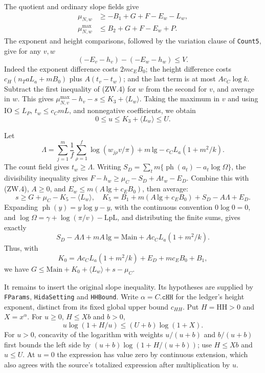 The quotient and ordinary slope fields give
\[
 \begin{split}
 \mu_{N,w}&\ge-B_1+G+F-E_w-L_w,\\
 \mu_{N,w}^{\max}&\le B_2+G+F-E_w+P.
 \end{split}                                                       \tag{ZW.4}
\]
The exponent and height comparisons, followed by the variation clause of
\texttt{Count5}, give for any $v,w$
\[
 (-E_v-h_v)-(-E_w-h_w)\le V.                                      \tag{ZW.5}
\]
Indeed the exponent difference costs $2mc_EB_0$; the height difference
costs $c_H(n_TaL_a+mB_0)$ plus $A(t_v-t_w)$; and the last term is
at most $Ac_C\log k$.  Subtract the first inequality of (ZW.4) for
$w$ from the second for $v$, and average in $w$.  This gives
$\mu_{N,v}^{\max}-h_v-s\le K_3+\langle L_w\rangle$.
Taking the maximum in $v$ and using
$\mathrm{IO}\le L_P$, $t_w\le c_CmL$, and nonnegative coefficients,
we obtain
\[
             0\le u\le K_3+\langle L_w\rangle\le U.              \tag{ZW.6}
\]

Let
\[
 \Lambda=\sum_{j=1}^m\frac1f\sum_{\rho=1}^f
                 \log(w_{j\rho}v/\pi)+m\,\mathrm{lg}
                       -c_C L_a(1+m^2/k).
\]
The count field gives $t_w\ge\Lambda$.
Writing $S_D=\sum_t m\{\operatorname{ph}(a_t)-a_t\log\Omega\}$,
the divisibility inequality gives
$F-h_w\ge\mu_C-S_D+At_w-E_D$.
Combine this with (ZW.4), $A\ge0$, and
$E_w\le m(A\,\mathrm{lg}+c_EB_0)$, then average:
\[
 s\ge G+\mu_C-K_5-\langle L_w\rangle,\quad
 K_5=B_1+m(A\,\mathrm{lg}+c_EB_0)+S_D-A\Lambda+E_D.
\]
Expanding $\operatorname{ph}(y)=y\log y-y$, with the continuous
convention $0\log0=0$, and
$\log\Omega=\gamma+\log(\pi/v)-\mathrm{LpL}$, and distributing
the finite sums, gives exactly
\[
 S_D-A\Lambda+mA\,\mathrm{lg}
       =\mathrm{Main}+Ac_C L_a(1+m^2/k).
\]
Thus, with
\[
              K_0=Ac_C L_a(1+m^2/k)+E_D+mc_EB_0+B_1,
\]
we have $G\le\mathrm{Main}+K_0+\langle L_w\rangle+s-\mu_C$.

It remains to insert the original slope inequality.  Its hypotheses are
supplied by \texttt{FParams}, \texttt{HidaSetting} and
\texttt{HHBound}.  Write $\alpha=C.\texttt{cHH}$ for the ledger's
height exponent, distinct from its fixed global upper bound $c_{HH}$.
Put $H=\mathrm{HH}>0$ and $X=x^\alpha$.
For $u\ge0$, $H\le Xb$ and $b>0$,
\[
                u\log(1+H/u)\le(U+b)\log(1+X).                  \tag{ZW.7}
\]
For $u>0$, concavity of the logarithm with weights
$u/(u+b)$ and $b/(u+b)$ first bounds the left side by
$(u+b)\log(1+H/(u+b))$; use $H\le Xb$ and $u\le U$.
At $u=0$ the expression has value zero by continuous extension,
which also agrees with the source's totalized expression after
multiplication by $u$.

